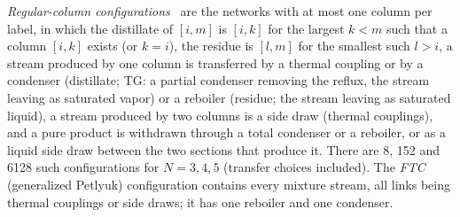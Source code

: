 \documentclass[11pt,a4paper]{report}
\begin{document}
\emph{Regular-column configurations}~\autocite{SA10,TGAT} are the networks with at most one column per label, in which
the distillate of $[i,m]$ is $[i,k]$ for the largest $k<m$ such that a column $[i,k]$ exists (or $k=i$), the residue is
$[l,m]$ for the smallest such $l>i$, a stream produced by one column is transferred by a thermal coupling or by a
condenser (distillate; TG: a partial condenser removing the reflux, the stream leaving as saturated vapor) or a reboiler
(residue; the stream leaving as saturated liquid), a stream produced by two columns is a side draw (thermal
couplings), and a pure product is withdrawn through a total condenser or a reboiler, or as a liquid side draw between
the two sections that produce it. There are 8, 152 and 6128 such configurations for $N=3,4,5$ (transfer choices
included). The \emph{FTC} (generalized Petlyuk) configuration contains every mixture stream, all links being thermal
couplings or side draws; it has one reboiler and one condenser.
\end{document}
